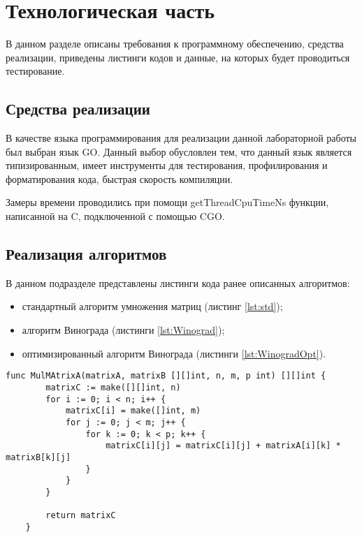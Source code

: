 \chapter{Технологическая часть}

В данном разделе описаны требования к программному обеспечению, средства
реализации, приведены листинги кодов и данные, на которых будет проводиться
тестирование.

\section{Средства реализации}

В качестве языка программирования для реализации данной лабораторной работы был выбран язык GO\cite{go}. Данный
выбор обусловлен тем, что данный язык является типизированным, имеет инструменты 
для тестирования, профилирования и форматирования кода, быстрая скорость компиляции.

Замеры времени проводились при помощи getThreadCpuTimeNs функции, написанной на C, 
подключенной с помощью CGO.\cite{cgo}

\section{Реализация алгоритмов}

В данном подразделе представлены листинги кода ранее описанных алгоритмов:
\begin{itemize}[left=\parindent]
    \item стандартный алгоритм умножения матриц (листинг \ref{lst:std});
    \item алгоритм Винограда (листинги \ref{lst:Winograd});
    \item оптимизированный алгоритм Винограда (листинги
        \ref{lst:WinogradOpt}).
\end{itemize}

\clearpage
\begin{lstlisting}[label=lst:std,caption=Реализация стандартного алгоритма умножения матриц]
func MulMAtrixA(matrixA, matrixB [][]int, n, m, p int) [][]int {
        matrixC := make([][]int, n)
        for i := 0; i < n; i++ {
            matrixC[i] = make([]int, m) 
            for j := 0; j < m; j++ { 
                for k := 0; k < p; k++ {
                    matrixC[i][j] = matrixC[i][j] + matrixA[i][k] * matrixB[k][j]
                }
            }
        }

        return matrixC
    }
\end{lstlisting}

